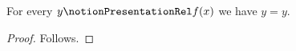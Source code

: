 

\begin{proposition}\label{notion_presentation_symbolic_bound}
    For every $y\notionPresentationRel f(x)$ we have $y=y$.
\end{proposition}
\begin{proof}
    Follows.
\end{proof}
